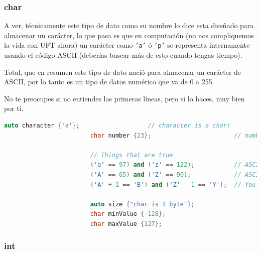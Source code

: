 \documentclass[12pt, fleqn]{report}                             %
\theoremstyle{break}                                            %
\newcommand{\textCode}[1]  { \texttt{#1} }                      %
\begin{document}
                \subsubsection{char}

                    A ver, técnicamente este tipo de dato como su nombre lo dice esta diseñado para almacenar
                    un carácter, lo que pasa es que en computación (no nos compliquemos la vida con UFT ahora)
                    un carácter como \textCode{'a'} ó \textCode{'p'} se representa internamente usando el código
                    ASCII (deberías buscar más de esto cuando tengas tiempo).
                    
                    Total, que en resumen este tipo de dato nació para almacenar un carácter de ASCII, 
                    por lo tanto es un tipo de datos numérico que va de 0 a 255.

                    No te preocupes si no entiendes las primeras líneas, pero si lo haces, muy bien por ti.
                    \begin{lstlisting}[language=C++, gobble=24]
                        auto character {'a'};                   // character is a char!
                        char number {23};                       // number is a char!

                        // Things that are true
                        ('a' == 97) and ('z' == 122);           // ASCII is just numbers
                        ('A' == 65) and ('Z' == 90);            // ASCII is just numbers
                        ('A' + 1 == 'B') and ('Z' - 1 == 'Y');  // You can do arithmetic

                        auto size {"char is 1 byte"};
                        char minValue {-128};
                        char maxValue {127};
                    \end{lstlisting}


                \clearpage
                \subsubsection{int}
\end{document}
